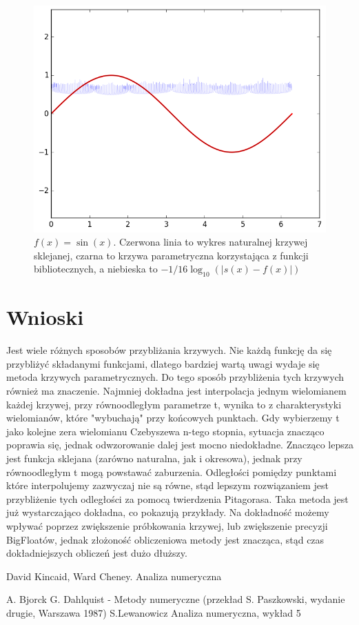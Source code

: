 \documentclass{article}
\begin{document}
\begin{figure}[H]
    \centering
	\includegraphics[width= 0.8 \textwidth]{sin.png}
    \caption{$f(x)=\sin(x)$. Czerwona linia to wykres naturalnej krzywej sklejanej, czarna to krzywa parametryczna korzystająca z funkcji bibliotecznych, a niebieska to $-1/16 \log_{10}(|s(x)-f(x)|) $}
 	\label{sin}
\end{figure}
\section{Wnioski}

Jest wiele różnych sposobów przybliżania krzywych. Nie każdą funkcję da się przybliżyć składanymi funkcjami, dlatego bardziej wartą uwagi wydaje się metoda krzywych parametrycznych. Do tego sposób przybliżenia tych krzywych również ma znaczenie. Najmniej dokładna jest interpolacja jednym wielomianem każdej krzywej, przy równoodległym parametrze t, wynika to z charakterystyki wielomianów, które "wybuchają" przy końcowych punktach. Gdy wybierzemy t jako kolejne zera wielomianu Czebyszewa n-tego stopnia, sytuacja znacząco poprawia się, jednak odwzorowanie dalej jest mocno niedokładne. Znacząco lepsza jest funkcja sklejana (zarówno naturalna, jak i okresowa), jednak przy równoodległym t mogą powstawać zaburzenia. Odległości pomiędzy punktami które interpolujemy zazwyczaj nie są równe, stąd lepszym rozwiązaniem jest przybliżenie tych odległości za pomocą twierdzenia Pitagorasa. Taka metoda jest już wystarczająco dokładna, co pokazują przykłady. Na dokładność możemy wpływać poprzez zwiększenie próbkowania krzywej, lub zwiększenie precyzji BigFloatów, jednak złożoność obliczeniowa metody jest znacząca, stąd czas dokładniejszych obliczeń jest dużo dłuższy.   
\begin{thebibliography}{9}
	\itemsep2pt
	     David Kincaid, Ward Cheney. Analiza numeryczna 

    A. Bjorck G. Dahlquist - Metody numeryczne (przekład S. Paszkowski, wydanie drugie, Warszawa 1987)
    S.Lewanowicz Analiza numeryczna, wykład 5
    
		
\end{thebibliography}
\end{document}
